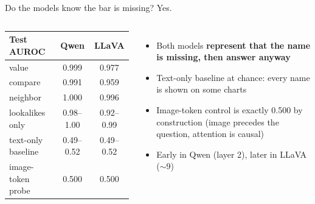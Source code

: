 \documentclass[10pt,aspectratio=169]{beamer}
\newcommand{\hl}[1]{\alert{\textbf{#1}}}
\begin{document}
\begin{frame}{Do the models know the bar is missing? Yes.}
\begin{columns}[T]
\begin{tabular}{lcc}
\toprule
Test AUROC & Qwen & LLaVA \\
\midrule
value & 0.999 & 0.977 \\
compare & 0.991 & 0.959 \\
neighbor & 1.000 & 0.996 \\
\midrule
lookalikes only & 0.98--1.00 & 0.92--0.99 \\
text-only baseline & 0.49--0.52 & 0.49--0.52 \\
image-token probe & 0.500 & 0.500 \\
\bottomrule
\end{tabular}
\begin{itemize}
\item Both models \hl{represent that the name is missing, then answer anyway}
\item Text-only baseline at chance: every name is shown on some charts
\item Image-token control is exactly 0.500 by construction (image precedes the
question, attention is causal)
\item Early in Qwen (layer 2), later in LLaVA ($\sim$9)
\end{itemize}
\end{columns}
\end{frame}
\end{document}
